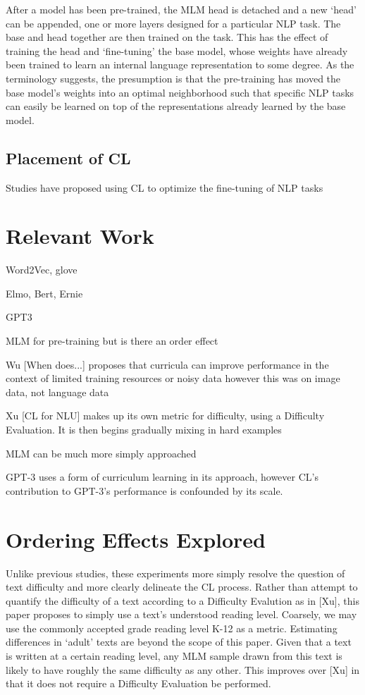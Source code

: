 \documentclass{article}
\begin{document}
After a model has been pre-trained, the MLM head is detached and a new `head' can be appended, one or more layers designed for a particular NLP task. The base and head together are then trained on the task. This has the effect of training the head and `fine-tuning' the base model, whose weights have already been trained to learn an internal language representation to some degree. As the terminology suggests, the presumption is that the pre-training has moved the base model's weights into an optimal neighborhood such that specific NLP tasks can easily be learned on top of the representations already learned by the base model.

\subsection{Placement of CL}

Studies have proposed using CL to optimize the fine-tuning of NLP tasks

\section{Relevant Work}

Word2Vec, glove

Elmo, Bert, Ernie

GPT3

MLM for pre-training but is there an order effect

Wu [When does...] proposes that curricula can improve performance in the context of limited training resources or noisy data
however this was on image data, not language data

Xu [CL for NLU] makes up its own metric for difficulty, using a Difficulty Evaluation. It is then begins gradually mixing in hard examples

MLM can be much more simply approached 

GPT-3 uses a form of curriculum learning in its approach, however CL's contribution to GPT-3's performance is confounded by its scale.

\section{Ordering Effects Explored}

Unlike previous studies, these experiments more simply resolve the question of text difficulty and more clearly delineate the CL process. Rather than attempt to quantify the difficulty of a text according to a Difficulty Evalution as in [Xu], this paper proposes to simply use a text's understood reading level. Coarsely, we may use the commonly accepted grade reading level K-12 as a metric. Estimating differences in `adult' texts are beyond the scope of this paper. Given that a text is written at a certain reading level, any MLM sample drawn from this text is likely to have roughly the same difficulty as any other. This improves over [Xu] in that it does not require a Difficulty Evaluation be performed.
\end{document}
